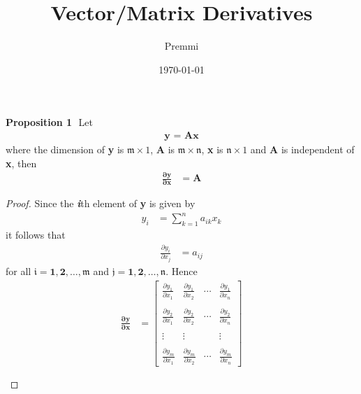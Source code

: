 \documentclass[14pt]{extarticle}
\title{Vector/Matrix Derivatives}
\author{Premmi}
\date{\today}
\begin{document}
    
\maketitle
\begin{flushleft}
\begin{large}
\textbf{Proposition 1} \,\,Let 
\begin{align}
\textbf{y = Ax}
\end{align}
where the dimension of \textbf{y} is $\mathfrak{m} \times 1$, \textbf{A} is $\mathfrak{m} \times \mathfrak{n}$, \textbf{x} is $\mathfrak{n} \times 1$ and \textbf{A} is independent of \textbf{x}, then
\begin{align}
\frac{\mathbf{\partial y}}{\mathbf{\partial x}} & = \mathbf{A}
\end{align}
\begin{proof}
Since the \emph{\textbf{i}}th element of \textbf{y} is given by
\begin{align}
\mathit{y}_\mathit{i} &= \sum_{k = 1}^{n} a_{ik} x_{k}
\end{align}
it follows that
\begin{align}
\frac{\partial \mathit{y}_\mathit{i}}{\partial \mathit{x}_\mathit{j}} &= a_{ij}
\end{align}
for all $\mathbf{\mathfrak{i} = 1,2,\ldots,\mathfrak{m}}$ and $\mathbf{\mathfrak{j} = 1,2,\ldots,\mathfrak{n}}$. Hence
\begin{align}
\frac{\mathbf{\partial y}}{\mathbf{\partial x}} &= \begin{bmatrix}
\frac{\partial \mathit{y}_\mathit{1}}{\partial \mathit{x}_\mathit{1}} & 
\frac{\partial \mathit{y}_\mathit{1}}{\partial \mathit{x}_\mathit{2}} &
\cdots &
\frac{\partial \mathit{y}_\mathit{1}}{\partial \mathit{x}_\mathit{n}} \\\\
\frac{\partial \mathit{y}_\mathit{2}}{\partial \mathit{x}_\mathit{1}} &
\frac{\partial \mathit{y}_\mathit{2}}{\partial \mathit{x}_\mathit{2}} &
\cdots &
\frac{\partial \mathit{y}_\mathit{2}}{\partial \mathit{x}_\mathit{n}} \\\\
\vdots & \vdots & &\vdots\\\\
\frac{\partial \mathit{y}_\mathit{m}}{\partial \mathit{x}_\mathit{1}} &
\frac{\partial \mathit{y}_\mathit{m}}{\partial \mathit{x}_\mathit{2}} &
\cdots &
\frac{\partial \mathit{y}_\mathit{m}}{\partial \mathit{x}_\mathit{n}}
\end{bmatrix}\\\\

\end{align}
\end{proof}
\end{large}
\end{flushleft}
\end{document}
